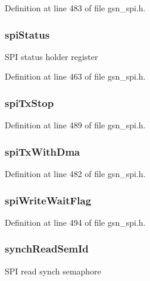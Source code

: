Definition at line 483 of file gsn\_\-spi.h.

\hypertarget{a00230_a8d5ce5c67020a6ef8da05f58f4593c0e}{
\subsubsection[{spiStatus}]{ {\bf spiStatus}}}
\label{a00230_a8d5ce5c67020a6ef8da05f58f4593c0e}
SPI status holder register 

Definition at line 463 of file gsn\_\-spi.h.

\hypertarget{a00230_aace49dfcb18e1db5bc4739a89ecc1ba3}{
\subsubsection[{spiTxStop}]{ {\bf spiTxStop}}}
\label{a00230_aace49dfcb18e1db5bc4739a89ecc1ba3}


Definition at line 489 of file gsn\_\-spi.h.

\hypertarget{a00230_a22c3c622b95eb6c2344e62fcd5ebc0bf}{
\subsubsection[{spiTxWithDma}]{ {\bf spiTxWithDma}}}
\label{a00230_a22c3c622b95eb6c2344e62fcd5ebc0bf}


Definition at line 482 of file gsn\_\-spi.h.

\hypertarget{a00230_aece15d1c03fade6b2bb0c58ae4d868c1}{
\subsubsection[{spiWriteWaitFlag}]{ {\bf spiWriteWaitFlag}}}
\label{a00230_aece15d1c03fade6b2bb0c58ae4d868c1}


Definition at line 494 of file gsn\_\-spi.h.

\hypertarget{a00230_a0ae46c6bc8db30c9e5f95b0db8291410}{
\subsubsection[{synchReadSemId}]{ {\bf synchReadSemId}}}
\label{a00230_a0ae46c6bc8db30c9e5f95b0db8291410}
SPI read synch semaphore 

